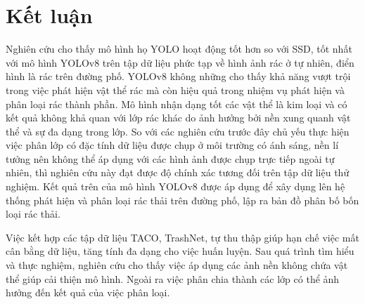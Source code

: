 \documentclass[../the.tex]{subfiles}
\begin{document}
\section{Kết luận}

{\fontsize{13}{12} \selectfont

Nghiên cứu cho thấy mô hình họ YOLO hoạt động tốt hơn so với SSD, tốt nhất với mô hình YOLOv8 trên tập dữ liệu phức tạp về hình ảnh rác ở tự nhiên, điển hình là rác trên đường phố.
YOLOv8 không những cho thấy khả năng vượt trội trong việc phát hiện vật thể rác mà còn hiệu quả trong nhiệm vụ phát hiện và phân loại rác thành phần.
Mô hình nhận dạng tốt các vật thể là kim loại và có kết quả không khả quan với lớp rác khác do ảnh hưởng bởi nền xung quanh vật thể và sự đa dạng trong lớp.
So với các nghiên cứu trước đây chủ yếu thực hiện việc phân lớp có đặc tính dữ liệu được chụp ở môi trường có ánh sáng, nền lí tưởng nên không thể áp dụng với các hình ảnh được chụp trực tiếp ngoài tự nhiên, thì nghiên cứu này đạt được độ chính xác tương đối trên tập dữ liệu thử nghiệm.
Kết quả trên của mô hình YOLOv8 được áp dụng để xây dụng lên hệ thống phát hiện và phân loại rác thải trên đường phố, lập ra bản đồ phân bố bốn loại rác thải.

}

\bigskip

{\fontsize{13}{12} \selectfont 
Việc kết hợp các tập dữ liệu TACO, TrashNet, tự thu thập giúp hạn chế việc mất cân bằng dữ liệu, tăng tính đa dạng cho việc huấn luyện.
Sau quá trình tìm hiểu và thực nghiệm, nghiên cứu cho thấy việc áp dụng các ảnh nền không chứa vật thể giúp cải thiện mô hình. Ngoài ra việc phân chia thành các lớp có thể ảnh hưởng đến kết quả của việc phân loại.

}
\end{document}
